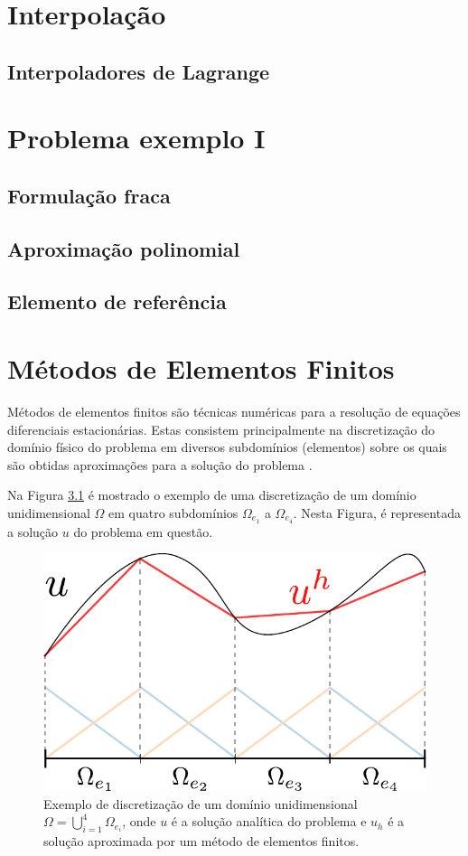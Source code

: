 \documentclass[12pt]{report}
\begin{document}
\chapter{Interpolação}
\section{Interpoladores de Lagrange}

\chapter{Problema exemplo I}
\section{Formulação fraca}
\section{Aproximação polinomial}
\section{Elemento de referência}

\chapter{Métodos de Elementos Finitos}
\label{c:elementos-finitos}
Métodos de elementos finitos são técnicas numéricas para a resolução de equações diferenciais estacionárias. Estas consistem principalmente na discretização do domínio físico do problema em diversos subdomínios (elementos) sobre os quais são obtidas aproximações para a solução do problema \cite{Zienkiewicz00}.

Na Figura \ref{f:mef-discretizacao} é mostrado o exemplo de uma discretização de um domínio unidimensional $\Omega$ em quatro subdomínios $\Omega_{e_1}$ a $\Omega_{e_4}$. Nesta Figura, é representada a solução $u$ do problema em questão.

\begin{figure}[h!]
	\centering
	\includegraphics[width=0.5\linewidth]{img/dominio-solucao1}
	\caption{Exemplo de discretização de um domínio unidimensional $\Omega = \bigcup_{i=1}^4 \Omega_{e_i}$, onde $u$ é a solução analítica do problema e $u_h$ é a solução aproximada por um método de elementos finitos.}
	\label{f:mef-discretizacao}
\end{figure}
\end{document}
